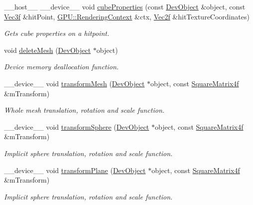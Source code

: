 \begin{DoxyCompactItemize}
\+\_\+\+\_\+host\+\_\+\+\_\+ \+\_\+\+\_\+device\+\_\+\+\_\+ void \hyperlink{group__intersection__test__prperties_ga33e6e14712999e0675085b5479201656}{cube\+Properties} (const \hyperlink{class_dev_object}{Dev\+Object} \&object, const \hyperlink{class_vec3}{Vec3f} \&hit\+Point, \hyperlink{struct_g_p_u_1_1_rendering_context}{G\+P\+U\+::\+Rendering\+Context} \&ctx, \hyperlink{class_vec2}{Vec2f} \&hit\+Texture\+Coordinates)
\begin{DoxyCompactList}\small\item\em Gets cube properties on a hitpoint. \end{DoxyCompactList}\item 
void \hyperlink{group__intersection__test__prperties_gae4e3caaa9b4a37b20a8a6f84d0c326aa}{delete\+Mesh} (\hyperlink{class_dev_object}{Dev\+Object} $\ast$object)
\begin{DoxyCompactList}\small\item\em Device memory deallocation function. \end{DoxyCompactList}\item 
\+\_\+\+\_\+device\+\_\+\+\_\+ void \hyperlink{group__intersection__test__prperties_ga4b2a399a49c34312c8369f54b79230af}{transform\+Mesh} (\hyperlink{class_dev_object}{Dev\+Object} $\ast$object, const \hyperlink{class_square_matrix4}{Square\+Matrix4f} \&m\+Transform)
\begin{DoxyCompactList}\small\item\em Whole mesh translation, rotation and scale function. \end{DoxyCompactList}\item 
\+\_\+\+\_\+device\+\_\+\+\_\+ void \hyperlink{group__intersection__test__prperties_ga6fe7123c4c4bdf775eac1231bc37c490}{transform\+Sphere} (\hyperlink{class_dev_object}{Dev\+Object} $\ast$object, const \hyperlink{class_square_matrix4}{Square\+Matrix4f} \&m\+Transform)
\begin{DoxyCompactList}\small\item\em Implicit sphere translation, rotation and scale function. \end{DoxyCompactList}\item 
\+\_\+\+\_\+device\+\_\+\+\_\+ void \hyperlink{group__intersection__test__prperties_ga6d2ae68047e8f8d11a64b9dc9dda507d}{transform\+Plane} (\hyperlink{class_dev_object}{Dev\+Object} $\ast$object, const \hyperlink{class_square_matrix4}{Square\+Matrix4f} \&m\+Transform)
\begin{DoxyCompactList}\small\item\em Implicit sphere translation, rotation and scale function. \end{DoxyCompactList}\item 

\end{DoxyCompactItemize}
